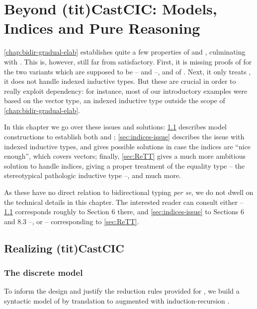\chapter{Beyond \kl(tit){CastCIC}: Models, Indices and Pure Reasoning}
\label{chap:beyond-gcic}

\cref{chap:bidir-gradual-elab} establishes quite a few properties of  and
, culminating with . This is, however, still far
from satisfactory. First, it is missing proofs of  for the two variants
which are supposed to be –  and  –, and of .
Next, it only treats , \ie it does not handle indexed inductive types.
But these are crucial in order to really exploit dependency:
for instance, most of our introductory examples were based on the vector type, an indexed
inductive type outside the scope of \cref{chap:bidir-gradual-elab}.

In this chapter we go over these issues and solutions: \cref{sec:realizing-cast-calculus}
describes model constructions to establish both  and ;
\cref{sec:indices-issue} describes the issue with indexed inductive types, and gives
possible solutions in case the indices are “nice enough”, which covers vectors; finally,
\cref{sec:ReTT} gives a much more ambitious solution to handle indices, giving a proper
treatment of the equality type – the stereotypical pathologic inductive type –, and much more.

As these have no direct relation to bidirectional typing \textit{per se},
we do not dwell on the technical details in this chapter.
The interested reader can consult either  –
\cref{sec:realizing-cast-calculus} corresponds roughly to
Section 6 there, and \cref{sec:indices-issue} to Sections 6 and 8.3 –, or
 – corresponding to \cref{sec:ReTT}.

\section{Realizing \kl(tit){CastCIC}}
\label{sec:realizing-cast-calculus}

\subsection{The discrete model}

To inform the design and justify the reduction rules provided for
, we build a syntactic model%
%
%
of  by translation to 
augmented with induction-recursion
.

